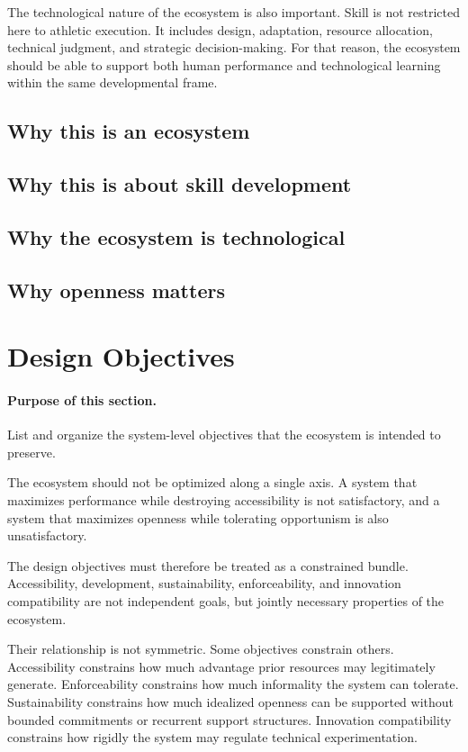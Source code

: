 \documentclass[11pt]{article}
\begin{document}
The technological nature of the ecosystem is also important. Skill is not restricted here to athletic execution. It includes design, adaptation, resource allocation, technical judgment, and strategic decision-making. For that reason, the ecosystem should be able to support both human performance and technological learning within the same developmental frame.

\subsection{Why this is an ecosystem}

\subsection{Why this is about skill development}

\subsection{Why the ecosystem is technological}

\subsection{Why openness matters}

\section{Design Objectives}

\paragraph{Purpose of this section.}
List and organize the system-level objectives that the ecosystem is intended to preserve.

The ecosystem should not be optimized along a single axis. A system that maximizes performance while destroying accessibility is not satisfactory, and a system that maximizes openness while tolerating opportunism is also unsatisfactory.

The design objectives must therefore be treated as a constrained bundle. Accessibility, development, sustainability, enforceability, and innovation compatibility are not independent goals, but jointly necessary properties of the ecosystem.

Their relationship is not symmetric. Some objectives constrain others. Accessibility constrains how much advantage prior resources may legitimately generate. Enforceability constrains how much informality the system can tolerate. Sustainability constrains how much idealized openness can be supported without bounded commitments or recurrent support structures. Innovation compatibility constrains how rigidly the system may regulate technical experimentation.
\end{document}
